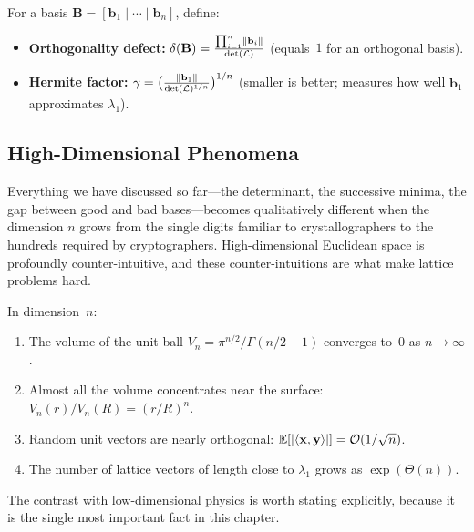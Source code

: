 \begin{definition}
\label{def:basis-quality}
For a basis $\mathbf{B} = [\mathbf{b}_1 \mid \cdots \mid \mathbf{b}_n]$, define:
\begin{itemize}
\item \textbf{Orthogonality defect:}
  $\delta(\mathbf{B}) = \frac{\prod_{i=1}^n \left\lVert \mathbf{b}_i \right\rVert}{\det(\mathcal{L})}$
  \quad(equals~$1$ for an orthogonal basis).
\item \textbf{Hermite factor:}
  $\gamma = \bigl(\frac{\left\lVert \mathbf{b}_1 \right\rVert}{\det(\mathcal{L})^{1/n}}\bigr)^{1/n}$
  \quad(smaller is better; measures how well $\mathbf{b}_1$ approximates $\lambda_1$).
\end{itemize}
\end{definition}


\subsection{High-Dimensional Phenomena}
\label{subsec:high-dim}

Everything we have discussed so far---the determinant, the successive minima, the gap between good and bad bases---becomes qualitatively different when the dimension $n$ grows from the single digits familiar to crystallographers to the hundreds required by cryptographers.  High-dimensional Euclidean space is profoundly counter-intuitive, and these counter-intuitions are what make lattice problems hard.

\begin{theorem}
\label{thm:high-dim}
In dimension~$n$:
\begin{enumerate}
\item The volume of the unit ball $V_n = \pi^{n/2}/\Gamma(n/2+1)$ converges to~$0$ as $n\to\infty$.
\item Almost all the volume concentrates near the surface: $V_n(r)/V_n(R) = (r/R)^n$.
\item Random unit vectors are nearly orthogonal: $\operatorname{\mathbb{E}}[\left\lvert \left\langle \mathbf{x}, \mathbf{y} \right\rangle \right\rvert] = \mathcal{O}(1/\sqrt{n})$.
\item The number of lattice vectors of length close to $\lambda_1$ grows as $\exp(\Theta(n))$.
\end{enumerate}
\end{theorem}

The contrast with low-dimensional physics is worth stating explicitly, because it is the single most important fact in this chapter.

